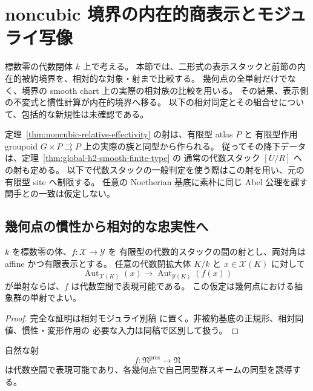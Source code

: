 \section{noncubic 境界の内在的商表示とモジュライ写像}
\label{sec:noncubic-boundary-comparison}

標数零の代数閉体 $k$ 上で考える。
本節では、二形式の表示スタックと前節の内在的被約境界を、相対的な対象・射まで比較する。
幾何点の全単射だけでなく、境界の smooth chart 上の実際の相対族の比較を用いる。
その結果、表示側の不変式と慣性計算が内在的境界へ移る。
以下の相対同定とその組合せについて、包括的な新規性は未確認である。

定理~\ref{thm:noncubic-relative-effectivity} の射は、有限型 atlas $P$ と
有限型作用 groupoid $G\times P\rightrightarrows P$ 上の実際の族と同型から作られる。
従ってその降下データは、定理~\ref{thm:global-h2-smooth-finite-type} の
通常の代数スタック $[U/R]$ への射も定める。
以下で代数スタックの一般判定を使う際はこの射を用い、元の有限型 site へ制限する。
任意の Noetherian 基底に素朴に同じ Abel 公理を課す関手との一致は仮定しない。

\subsection{幾何点の慣性から相対的な忠実性へ}

\begin{lemma}[標数零における相対慣性の消滅]
\label{lem:charzero-geometric-inertia-faithful}
$k$ を標数零の体、$f:\mathcal X\to\mathcal Y$ を
有限型の代数的スタックの間の射とし、両対角は affine かつ有限表示とする。
任意の代数閉拡大体 $K/k$ と $x\in\mathcal X(K)$ に対して
\[
 \operatorname{Aut}_{\mathcal X(K)}(x)
 \longrightarrow\operatorname{Aut}_{\mathcal Y(K)}(f(x))
\]
が単射ならば、$f$ は代数空間で表現可能である。
この仮定は幾何点における抽象群の単射でよい。
\end{lemma}

\begin{proof}
完全な証明は相対モジュライ別稿
\cite[noncubic 境界の相対表示とモジュライ写像]{QuadricModuli2026}
に置く。非被約基底の正規形、相対同値、慣性・変形作用の
必要な入力は同稿で区別して扱う。
\end{proof}

\begin{lemma}[幾何点の自己同型群のスキームとしての比較]
\label{lem:nc-geometric-inertia-scheme-iso}
自然な射
\[
 f:\mathfrak N^{\mathrm{pres}}\longrightarrow\mathfrak N
\]
は代数空間で表現可能であり、各幾何点で自己同型群スキームの同型を誘導する。
\end{lemma}

